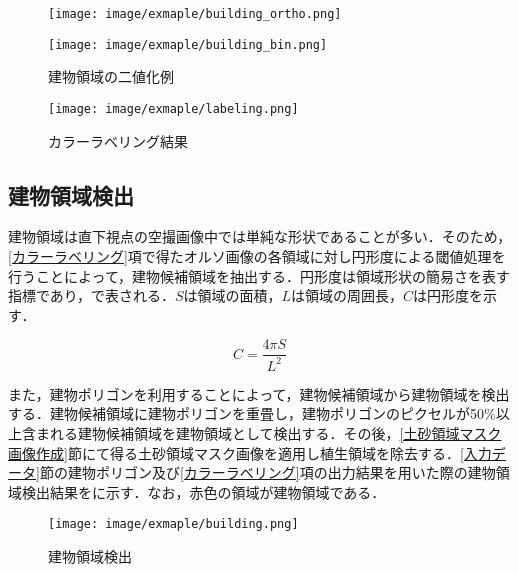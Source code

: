       \begin{figure}[tbp]
        \begin{minipage}[c]{0.5\hsize}
          \centering
          \texttt{[image: image/exmaple/building\_ortho.png]}
        \end{minipage}
        \begin{minipage}[c]{0.45\hsize}
          \centering
          \texttt{[image: image/exmaple/building\_bin.png]}
        \end{minipage}
        \caption{建物領域の二値化例}
        \label{建物領域の二値化例}
      \end{figure}

      \begin{figure}[tbp]
        \centering
        \texttt{[image: image/exmaple/labeling.png]}
        \caption{カラーラベリング結果}
        \label{カラーラベリング結果}
      \end{figure}


    \subsection{建物領域検出}
      \label{建物領域検出}
      建物領域は直下視点の空撮画像中では単純な形状であることが多い．そのため，\ref{カラーラベリング}項で得たオルソ画像の各領域に対し円形度による閾値処理を行うことによって，建物候補領域を抽出する．円形度は領域形状の簡易さを表す指標であり，で表される．$S$は領域の面積，$L$は領域の周囲長，$C$は円形度を示す．

      \begin{equation}
        \label{円形度}
        C = \dfrac{4 \pi S} {L^2} 
      \end{equation}

      また，建物ポリゴンを利用することによって，建物候補領域から建物領域を検出する．建物候補領域に建物ポリゴンを重畳し，建物ポリゴンのピクセルが50\%以上含まれる建物候補領域を建物領域として検出する．その後，\ref{土砂領域マスク画像作成}節にて得る土砂領域マスク画像を適用し植生領域を除去する．\ref{入力データ}節の建物ポリゴン及び\ref{カラーラベリング}項の出力結果を用いた際の建物領域検出結果をに示す．なお，赤色の領域が建物領域である．
      
      \begin{figure}[tbp]
        \centering
        \texttt{[image: image/exmaple/building.png]}
        \caption{建物領域検出}
        \label{建物領域検出結果}
      \end{figure}



